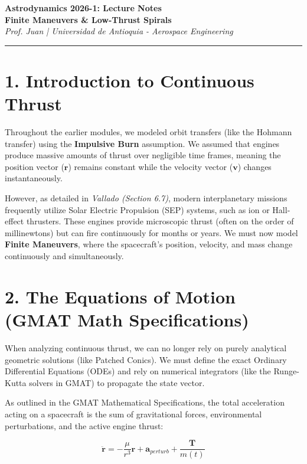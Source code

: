 \documentclass[11pt, a4paper]{article}
\begin{document}
\begin{center}
    {\Large \textbf{Astrodynamics 2026-1: Lecture Notes}} \\
    \vspace{0.2cm}
    {\huge \textbf{Finite Maneuvers \& Low-Thrust Spirals}} \\
    \vspace{0.4cm}
    \textit{Prof. Juan | Universidad de Antioquia - Aerospace Engineering}
\end{center}

\hrule
\vspace{0.5cm}

\section*{1. Introduction to Continuous Thrust}
Throughout the earlier modules, we modeled orbit transfers (like the Hohmann transfer) using the \textbf{Impulsive Burn} assumption. We assumed that engines produce massive amounts of thrust over negligible time frames, meaning the position vector ($\boldsymbol{r}$) remains constant while the velocity vector ($\boldsymbol{v}$) changes instantaneously.

However, as detailed in \textit{Vallado (Section 6.7)}, modern interplanetary missions frequently utilize Solar Electric Propulsion (SEP) systems, such as ion or Hall-effect thrusters. These engines provide microscopic thrust (often on the order of millinewtons) but can fire continuously for months or years. We must now model \textbf{Finite Maneuvers}, where the spacecraft's position, velocity, and mass change continuously and simultaneously.

\section*{2. The Equations of Motion (GMAT Math Specifications)}
When analyzing continuous thrust, we can no longer rely on purely analytical geometric solutions (like Patched Conics). We must define the exact Ordinary Differential Equations (ODEs) and rely on numerical integrators (like the Runge-Kutta solvers in GMAT) to propagate the state vector.

As outlined in the GMAT Mathematical Specifications, the total acceleration acting on a spacecraft is the sum of gravitational forces, environmental perturbations, and the active engine thrust:

\begin{equation}
    \ddot{\boldsymbol{r}} = -\frac{\mu}{r^3}\boldsymbol{r} + \boldsymbol{a}_{perturb} + \frac{\boldsymbol{T}}{m(t)}
\end{equation}
\end{document}
